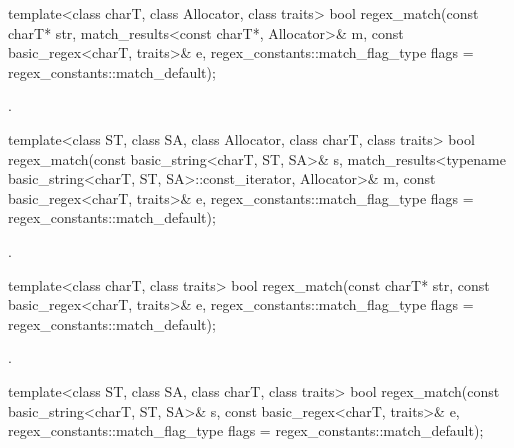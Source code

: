 %
\begin{itemdecl}
template<class charT, class Allocator, class traits>
  bool regex_match(const charT* str,
                   match_results<const charT*, Allocator>& m,
                   const basic_regex<charT, traits>& e,
                   regex_constants::match_flag_type flags = regex_constants::match_default);
\end{itemdecl}

\begin{itemdescr}
\pnum
\returns
{}.
\end{itemdescr}

%
\begin{itemdecl}
template<class ST, class SA, class Allocator, class charT, class traits>
  bool regex_match(const basic_string<charT, ST, SA>& s,
                   match_results<typename basic_string<charT, ST, SA>::const_iterator,
                                 Allocator>& m,
                   const basic_regex<charT, traits>& e,
                   regex_constants::match_flag_type flags = regex_constants::match_default);
\end{itemdecl}

\begin{itemdescr}
\pnum
\returns
{}.
\end{itemdescr}

%
\begin{itemdecl}
template<class charT, class traits>
  bool regex_match(const charT* str,
                   const basic_regex<charT, traits>& e,
                   regex_constants::match_flag_type flags = regex_constants::match_default);
\end{itemdecl}

\begin{itemdescr}
\pnum
\returns
{}.
\end{itemdescr}

%
\begin{itemdecl}
template<class ST, class SA, class charT, class traits>
  bool regex_match(const basic_string<charT, ST, SA>& s,
                   const basic_regex<charT, traits>& e,
                   regex_constants::match_flag_type flags = regex_constants::match_default);
\end{itemdecl}


